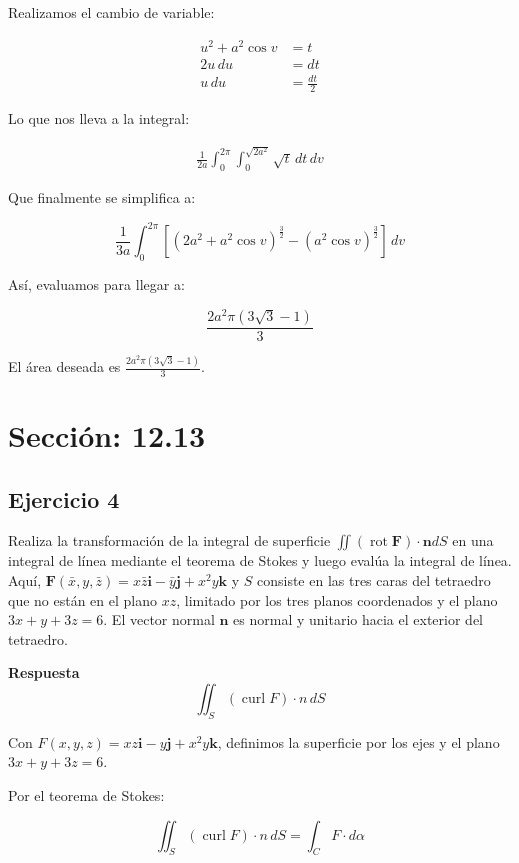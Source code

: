 \documentclass{report}
\begin{document}
Realizamos el cambio de variable:

\[
\begin{aligned}
u^2 + a^2 \cos v &= t \\
2u \, du &= dt \\
u \, du &= \frac{dt}{2}
\end{aligned}
\]

Lo que nos lleva a la integral:

\[
\begin{aligned}
\frac{1}{2a} \int_0^{2 \pi} \int_0^{\sqrt{2 a^2}} \sqrt{t} \, dt \, dv
\end{aligned}
\]

Que finalmente se simplifica a:

\[
\frac{1}{3a} \int_0^{2 \pi} \left[ \left( 2a^2 + a^2 \cos v \right)^{\frac{3}{2}} - \left( a^2 \cos v \right)^{\frac{3}{2}} \right] \, dv
\]

Así, evaluamos para llegar a:

\[
\frac{2 a^2 \pi(3\sqrt{3} - 1)}{3}
\]

El área deseada es \( \frac{2 a^2 \pi(3\sqrt{3} - 1)}{3} \).
\section*{\textcolor{color1213}{Sección: 12.13}}
\subsection*{Ejercicio 4}
Realiza la transformación de la integral de superficie $\iint(\operatorname{rot} \boldsymbol{F}) \cdot \boldsymbol{n} d S$ en una integral de línea mediante el teorema de Stokes y luego evalúa la integral de línea. Aquí, $\boldsymbol{F}(\bar{x}, y, \bar{z})=x \bar{z} \mathbf{i}-\bar{y} \mathbf{j}+x^2 y \boldsymbol{k}$ y \( S \) consiste en las tres caras del tetraedro que no están en el plano $x z$, limitado por los tres planos coordenados y el plano $3 x+y+3 z=6$. El vector normal $\boldsymbol{n}$ es normal y unitario hacia el exterior del tetraedro.

\textbf{Respuesta}
\[
\iint_S (\operatorname{curl} F) \cdot n \, dS
\]

Con \( F(x, y, z) = xz \mathbf{i} - y \mathbf{j} + x^2 y \mathbf{k} \), definimos la superficie por los ejes y el plano $3x + y + 3z = 6$.

Por el teorema de Stokes:

\[
\iint_S (\operatorname{curl} F) \cdot n \, dS = \int_C F \cdot d \alpha
\]
\end{document}
